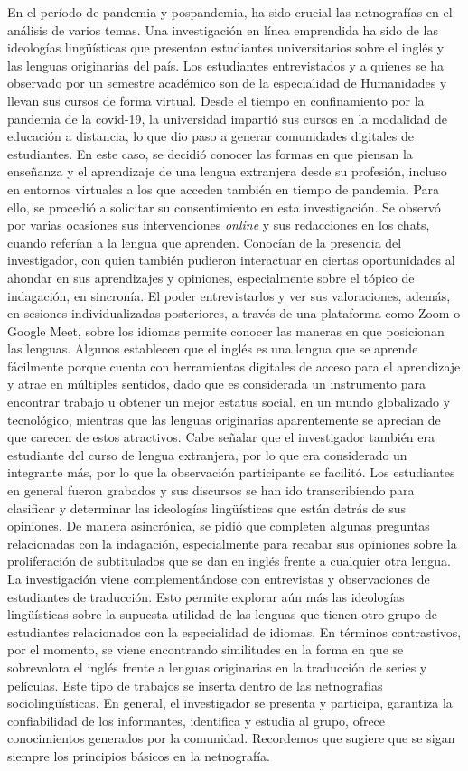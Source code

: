 En el período de pandemia y pospandemia, ha sido crucial las
netnografías en el análisis de varios temas. Una investigación en línea
emprendida ha sido de las ideologías lingüísticas que presentan
estudiantes universitarios sobre el inglés y las lenguas originarias del
país. Los estudiantes entrevistados y a quienes se ha observado por un
semestre académico son de la especialidad de Humanidades y llevan sus
cursos de forma virtual. Desde el tiempo en confinamiento por la
pandemia de la covid-19, la universidad impartió sus cursos en la
modalidad de educación a distancia, lo que dio paso a generar
comunidades digitales de estudiantes. En este caso, se decidió conocer
las formas en que piensan la enseñanza y el aprendizaje de una lengua
extranjera desde su profesión, incluso en entornos virtuales a los que
acceden también en tiempo de pandemia. Para ello, se procedió a
solicitar su consentimiento en esta investigación. Se observó por varias
ocasiones sus intervenciones \emph{online} y sus redacciones en los
chats, cuando referían a la lengua que aprenden. Conocían de la
presencia del investigador, con quien también pudieron interactuar en
ciertas oportunidades al ahondar en sus aprendizajes y opiniones,
especialmente sobre el tópico de indagación, en sincronía. El poder
entrevistarlos y ver sus valoraciones, además, en sesiones
individualizadas posteriores, a través de una plataforma como Zoom o
Google Meet, sobre los idiomas permite conocer las maneras en que
posicionan las lenguas. Algunos establecen que el inglés es una lengua
que se aprende fácilmente porque cuenta con herramientas digitales de
acceso para el aprendizaje y atrae en múltiples sentidos, dado que es
considerada un instrumento para encontrar trabajo u obtener un mejor
estatus social, en un mundo globalizado y tecnológico, mientras que las
lenguas originarias aparentemente se aprecian de que carecen de estos
atractivos. Cabe señalar que el investigador también era estudiante del
curso de lengua extranjera, por lo que era considerado un integrante
más, por lo que la observación participante se facilitó. Los estudiantes
en general fueron grabados y sus discursos se han ido transcribiendo
para clasificar y determinar las ideologías lingüísticas que están
detrás de sus opiniones. De manera asincrónica, se pidió que completen
algunas preguntas relacionadas con la indagación, especialmente para
recabar sus opiniones sobre la proliferación de subtitulados que se dan
en inglés frente a cualquier otra lengua. La investigación viene
complementándose con entrevistas y observaciones de estudiantes de
traducción. Esto permite explorar aún más las ideologías lingüísticas
sobre la supuesta utilidad de las lenguas que tienen otro grupo de
estudiantes relacionados con la especialidad de idiomas. En términos
contrastivos, por el momento, se viene encontrando similitudes en la
forma en que se sobrevalora el inglés frente a lenguas originarias en la
traducción de series y películas. Este tipo de trabajos se inserta
dentro de las netnografías sociolingüísticas. En general, el
investigador se presenta y participa, garantiza la confiabilidad de los
informantes, identifica y estudia al grupo, ofrece conocimientos
generados por la comunidad. Recordemos que \textcite{kozinets2002} sugiere que
se sigan siempre los principios básicos en la netnografía.